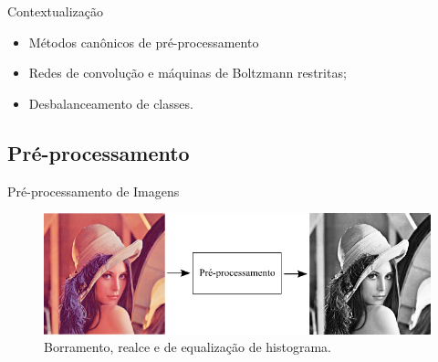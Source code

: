 \documentclass{beamer}
\begin{document}
\begin{frame}{Contextualização}
\setlength\leftmargini{0em}
\justifying
{}
\begin{itemize}
    \item Métodos canônicos de pré-processamento
    \item Redes de convolução e máquinas de Boltzmann restritas;
    \item Desbalanceamento de classes.
\end{itemize}
\end{frame}
\subsection{Pré-processamento}
\begin{frame}{Pré-processamento de Imagens}
\begin{figure}[htbp]
 \begin{center}
   \includegraphics[width=1\linewidth]{figuras/preprocessamento.png}
 \caption{Borramento, realce e de equalização de histograma.}
 \end{center}
\end{figure}
\end{frame}
\end{document}

